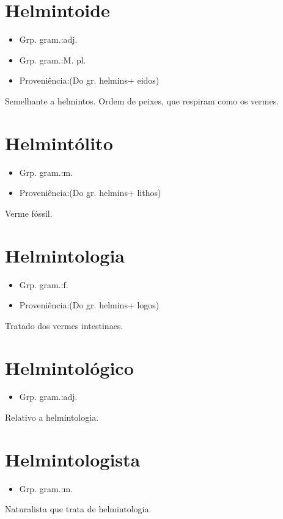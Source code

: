 \documentclass{article}
\begin{document}
\section{Helmintoide}
\begin{itemize}
\item {Grp. gram.:adj.}
\end{itemize}
\begin{itemize}
\item {Grp. gram.:M. pl.}
\end{itemize}
\begin{itemize}
\item {Proveniência:(Do gr. \textunderscore helmins\textunderscore  + \textunderscore eidos\textunderscore )}
\end{itemize}
Semelhante a helmintos.
Ordem de peixes, que respiram como os vermes.
\section{Helmintólito}
\begin{itemize}
\item {Grp. gram.:m.}
\end{itemize}
\begin{itemize}
\item {Proveniência:(Do gr. \textunderscore helmins\textunderscore  + \textunderscore lithos\textunderscore )}
\end{itemize}
Verme fóssil.
\section{Helmintologia}
\begin{itemize}
\item {Grp. gram.:f.}
\end{itemize}
\begin{itemize}
\item {Proveniência:(Do gr. \textunderscore helmins\textunderscore  + \textunderscore logos\textunderscore )}
\end{itemize}
Tratado dos vermes intestinaes.
\section{Helmintológico}
\begin{itemize}
\item {Grp. gram.:adj.}
\end{itemize}
Relativo a helmintologia.
\section{Helmintologista}
\begin{itemize}
\item {Grp. gram.:m.}
\end{itemize}
Naturalista que trata de helmintologia.
\end{document}
